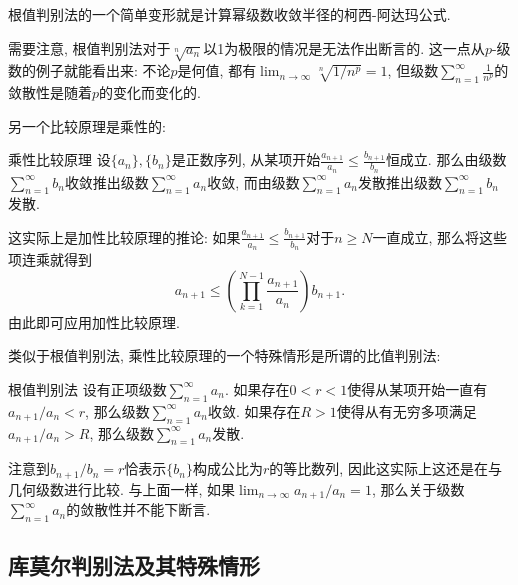 根值判别法的一个简单变形就是计算幂级数收敛半径的柯西-阿达玛公式.

需要注意, 根值判别法对于$\sqrt[n]{a_n}$以1为极限的情况是无法作出断言的. 这一点从$p$-级数的例子就能看出来: 不论$p$是何值, 都有$\lim_{n\to\infty}\sqrt[n]{1/n^p}=1$, 但级数$\sum_{n=1}^\infty\frac{1}{n^p}$的敛散性是随着$p$的变化而变化的.

另一个比较原理是乘性的:
\begin{theorem}{乘性比较原理}
设$\{a_n\},\{b_n\}$是正数序列, 从某项开始$\frac{a_{n+1}}{a_n}\leq \frac{b_{n+1}}{b_n}$恒成立. 那么由级数$\sum_{n=1}^\infty b_n$收敛推出级数$\sum_{n=1}^\infty a_n$收敛, 而由级数$\sum_{n=1}^\infty a_n$发散推出级数$\sum_{n=1}^\infty b_n$发散.
\end{theorem}
这实际上是加性比较原理的推论: 如果$\frac{a_{n+1}}{a_n}\leq \frac{b_{n+1}}{b_n}$对于$n\geq N$一直成立, 那么将这些项连乘就得到
$$
a_{n+1}\leq \left(\prod_{k=1}^{N-1}\frac{a_{n+1}}{a_n}\right)b_{n+1}.
$$
由此即可应用加性比较原理.

类似于根值判别法, 乘性比较原理的一个特殊情形是所谓的比值判别法:
\begin{theorem}{根值判别法}
设有正项级数$\sum_{n=1}^\infty a_n$. 如果存在$0<r<1$使得从某项开始一直有$a_{n+1}/a_n<r$, 那么级数$\sum_{n=1}^\infty a_n$收敛. 如果存在$R>1$使得从有无穷多项满足$a_{n+1}/{a_n}>R$, 那么级数$\sum_{n=1}^\infty a_n$发散.
\end{theorem}
注意到$b_{n+1}/b_n=r$恰表示$\{b_n\}$构成公比为$r$的等比数列, 因此这实际上这还是在与几何级数进行比较. 与上面一样, 如果$\lim_{n\to\infty}a_{n+1}/a_n=1$, 那么关于级数$\sum_{n=1}^\infty a_n$的敛散性并不能下断言.

\subsection{库莫尔判别法及其特殊情形}
